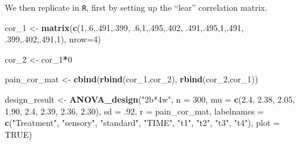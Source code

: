 \documentclass[
]{book}
\newenvironment{Shaded}{\begin{snugshade}}{\end{snugshade}}
\newcommand{\DataTypeTok}[1]{\textcolor[rgb]{0.13,0.29,0.53}{#1}}
\newcommand{\DecValTok}[1]{\textcolor[rgb]{0.00,0.00,0.81}{#1}}
\newcommand{\FloatTok}[1]{\textcolor[rgb]{0.00,0.00,0.81}{#1}}
\newcommand{\KeywordTok}[1]{\textcolor[rgb]{0.13,0.29,0.53}{\textbf{#1}}}
\newcommand{\NormalTok}[1]{#1}
\newcommand{\OperatorTok}[1]{\textcolor[rgb]{0.81,0.36,0.00}{\textbf{#1}}}
\newcommand{\OtherTok}[1]{\textcolor[rgb]{0.56,0.35,0.01}{#1}}
\newcommand{\StringTok}[1]{\textcolor[rgb]{0.31,0.60,0.02}{#1}}
\begin{document}
We then replicate in \texttt{R}, first by setting up the ``lear'' correlation matrix.

\begin{Shaded}
\begin{Highlighting}[]
\NormalTok{cor_}\DecValTok{1}\NormalTok{ <-}\StringTok{ }\KeywordTok{matrix}\NormalTok{(}\KeywordTok{c}\NormalTok{(}\DecValTok{1}\NormalTok{,.}\DecValTok{6}\NormalTok{,.}\DecValTok{491}\NormalTok{,.}\DecValTok{399}\NormalTok{,}
                  \FloatTok{.6}\NormalTok{,}\DecValTok{1}\NormalTok{,.}\DecValTok{495}\NormalTok{,.}\DecValTok{402}\NormalTok{,}
                  \FloatTok{.491}\NormalTok{,.}\DecValTok{495}\NormalTok{,}\DecValTok{1}\NormalTok{,.}\DecValTok{491}\NormalTok{,}
                  \FloatTok{.399}\NormalTok{,.}\DecValTok{402}\NormalTok{,.}\DecValTok{491}\NormalTok{,}\DecValTok{1}\NormalTok{), }\DataTypeTok{nrow=}\DecValTok{4}\NormalTok{)}

\NormalTok{cor_}\DecValTok{2}\NormalTok{ <-}\StringTok{ }\NormalTok{cor_}\DecValTok{1}\OperatorTok{*}\DecValTok{0}

\NormalTok{pain_cor_mat <-}\StringTok{ }\KeywordTok{cbind}\NormalTok{(}\KeywordTok{rbind}\NormalTok{(cor_}\DecValTok{1}\NormalTok{,cor_}\DecValTok{2}\NormalTok{),}
                      \KeywordTok{rbind}\NormalTok{(cor_}\DecValTok{2}\NormalTok{,cor_}\DecValTok{1}\NormalTok{))}

\NormalTok{design_result <-}\StringTok{ }\KeywordTok{ANOVA_design}\NormalTok{(}\StringTok{"2b*4w"}\NormalTok{,}
                              \DataTypeTok{n =} \DecValTok{300}\NormalTok{,}
                              \DataTypeTok{mu =} \KeywordTok{c}\NormalTok{(}\FloatTok{2.4}\NormalTok{, }\FloatTok{2.38}\NormalTok{, }\FloatTok{2.05}\NormalTok{, }\FloatTok{1.90}\NormalTok{,}
                                     \FloatTok{2.4}\NormalTok{, }\FloatTok{2.39}\NormalTok{, }\FloatTok{2.36}\NormalTok{, }\FloatTok{2.30}\NormalTok{),}
                              \DataTypeTok{sd =} \FloatTok{.92}\NormalTok{,}
                              \DataTypeTok{r =}\NormalTok{ pain_cor_mat,}
                              \DataTypeTok{labelnames =} \KeywordTok{c}\NormalTok{(}\StringTok{"Treatment"}\NormalTok{, }\StringTok{"sensory"}\NormalTok{, }\StringTok{"standard"}\NormalTok{,}
                                             \StringTok{"TIME"}\NormalTok{, }\StringTok{"t1"}\NormalTok{, }\StringTok{"t2"}\NormalTok{, }\StringTok{"t3"}\NormalTok{, }\StringTok{"t4"}\NormalTok{),}
                              \DataTypeTok{plot =} \OtherTok{TRUE}\NormalTok{)}
\end{Highlighting}
\end{Shaded}
\end{document}
